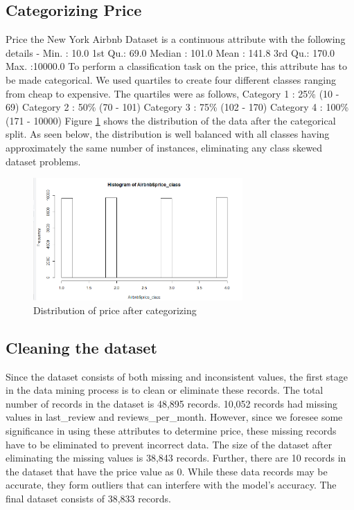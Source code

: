 \documentclass{sig-alternate}
\begin{document}
	\subsection{Categorizing Price}
	Price the New York Airbnb Dataset is a continuous attribute with the following details - \newline
	Min.   :    10.0  \newline
	1st Qu.:   69.0  \newline
	Median :  101.0  \newline
	Mean   :  141.8  \newline
	3rd Qu.:  170.0  \newline
	Max.   :10000.0  \newline
	To perform a classification task on the price, this attribute has to be made categorical. We used quartiles to create four different classes ranging from cheap to expensive. The quartiles were as follows,
	Category 1 : 25\% (10 - 69) \newline
	Category 2 : 50\% (70 - 101) \newline
	Category 3 : 75\% (102 - 170) \newline
	Category 4 : 100\% (171 - 10000) \newline
	Figure \ref{dist} shows the distribution of the data after the categorical split. As seen below, the distribution is well balanced with all classes having approximately the same number of instances, eliminating any class skewed dataset problems.
	\begin{figure}[ht]
		\includegraphics[width=8cm]{dist.png}
		\caption{Distribution of price after categorizing}
		\label{dist}
		\centering
	\end{figure}
	\subsection{Cleaning the dataset}
	Since the dataset consists of both missing and inconsistent values, the first stage in the data mining process is to clean or eliminate these records.
	The total number of records in the dataset is 48,895 records. 10,052 records had missing values in last\_review and reviews\_per\_month. However, since we foresee some significance in using these attributes to determine price, these missing records have to be eliminated to prevent incorrect data. The size of the dataset after eliminating the missing values is 38,843 records.
	Further, there are 10 records in the dataset that have the price value as 0. While these data records may be accurate, they form outliers that can interfere with the model's accuracy. 
	The final dataset consists of 38,833 records. 
\end{document}
